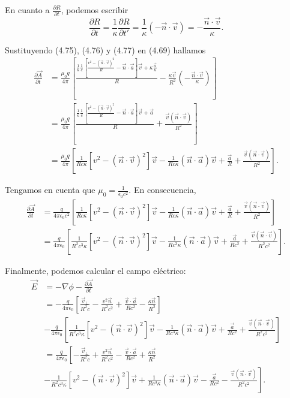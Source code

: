 \documentclass[12pt,a4paper]{book}
\begin{document}
En cuanto a $\frac{\partial R}{\partial t}$, podemos escribir
\begin{equation}
\frac{\partial R}{\partial t} = \frac{1}{\kappa}\frac{\partial R}{\partial t'} = \frac{1}{\kappa}(-\vec{n} \cdot \vec{v}) = -\frac{\vec{n} \cdot \vec{v}}{\kappa}.
\end{equation}

Sustituyendo (4.75), (4.76) y (4.77) en (4.69) hallamos
\begin{align}
\frac{\partial\vec{A}}{\partial t} &= \frac{\mu_0 q}{4\pi}\left[\frac{\frac{1}{\kappa}\frac{1}{c}\left[\frac{v^2 - (\vec{n} \cdot \vec{v})^2}{R} - \vec{n} \cdot \vec{a}\right]\vec{v} + \kappa\frac{\vec{a}}{\kappa}}{R} - \frac{\kappa\vec{v}}{R^2}\left(-\frac{\vec{n} \cdot \vec{v}}{\kappa}\right)\right] \nonumber \\
&= \frac{\mu_0 q}{4\pi}\left[\frac{\frac{1}{\kappa}\frac{1}{c}\left[\frac{v^2 - (\vec{n} \cdot \vec{v})^2}{R} - \vec{n} \cdot \vec{a}\right]\vec{v} + \vec{a}}{R} + \frac{\vec{v}(\vec{n} \cdot \vec{v})}{R^2}\right] \nonumber \\
&= \frac{\mu_0 q}{4\pi}\left[\frac{1}{Rc\kappa}[v^2 - (\vec{n} \cdot \vec{v})^2]\vec{v} - \frac{1}{Rc\kappa}(\vec{n} \cdot \vec{a})\vec{v} + \frac{\vec{a}}{R} + \frac{\vec{v}(\vec{n} \cdot \vec{v})}{R^2}\right].
\end{align}

Tengamos en cuenta que $\mu_0 = \frac{1}{\epsilon_0 c^2}$. En consecuencia,
\begin{align}
\frac{\partial\vec{A}}{\partial t} &= \frac{q}{4\pi\epsilon_0 c^2}\left[\frac{1}{Rc\kappa}[v^2 - (\vec{n} \cdot \vec{v})^2]\vec{v} - \frac{1}{Rc\kappa}(\vec{n} \cdot \vec{a})\vec{v} + \frac{\vec{a}}{R} + \frac{\vec{v}(\vec{n} \cdot \vec{v})}{R^2}\right] \nonumber \\
&= \frac{q}{4\pi\epsilon_0}\left[\frac{1}{R^2c^3\kappa}[v^2 - (\vec{n} \cdot \vec{v})^2]\vec{v} - \frac{1}{Rc^3\kappa}(\vec{n} \cdot \vec{a})\vec{v} + \frac{\vec{a}}{Rc^2} + \frac{\vec{v}(\vec{n} \cdot \vec{v})}{R^2c^2}\right].
\end{align}

Finalmente, podemos calcular el campo eléctrico:
\begin{align}
\vec{E} &= -\nabla\phi - \frac{\partial\vec{A}}{\partial t} \nonumber \\
&= -\frac{q}{4\pi\epsilon_0}\left[\frac{\vec{v}_{\perp}}{R^2c} - \frac{v^2\vec{n}}{R^2c^2} + \frac{\vec{v} \cdot \vec{a}}{Rc^2} - \frac{\kappa\vec{n}}{R^2}\right] \nonumber \\
&- \frac{q}{4\pi\epsilon_0}\left[\frac{1}{R^2c^3\kappa}[v^2 - (\vec{n} \cdot \vec{v})^2]\vec{v} - \frac{1}{Rc^3\kappa}(\vec{n} \cdot \vec{a})\vec{v} + \frac{\vec{a}}{Rc^2} + \frac{\vec{v}(\vec{n} \cdot \vec{v})}{R^2c^2}\right] \nonumber \\
&= \frac{q}{4\pi\epsilon_0}\left[-\frac{\vec{v}_{\perp}}{R^2c} + \frac{v^2\vec{n}}{R^2c^2} - \frac{\vec{v} \cdot \vec{a}}{Rc^2} + \frac{\kappa\vec{n}}{R^2} \right. \nonumber \\
&\left. -\frac{1}{R^2c^3\kappa}[v^2 - (\vec{n} \cdot \vec{v})^2]\vec{v} + \frac{1}{Rc^3\kappa}(\vec{n} \cdot \vec{a})\vec{v} - \frac{\vec{a}}{Rc^2} - \frac{\vec{v}(\vec{n} \cdot \vec{v})}{R^2c^2}\right].
\end{align}
\end{document}
